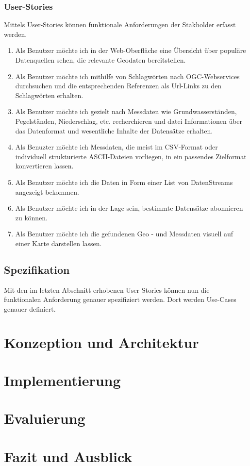 \documentclass[a4paper,12pt]{scrreprt}
\begin{document}
\subsection{User-Stories}
Mittels User-Stories können funktionale Anforderungen der Stakholder erfasst werden.
\begin{enumerate}
\item Als Benutzer möchte ich in der Web-Oberfläche eine Übersicht über populäre Datenquellen sehen, die  relevante Geodaten bereitstellen.
\item Als Benutzer möchte ich mithilfe von Schlagwörten nach OGC-Webservices durchsuchen und die entsprechenden Referenzen als Url-Links zu den Schlagwörten erhalten.
\item Als Benutzer möchte ich gezielt nach Messdaten wie Grundwasserständen, Pegelständen, Niederschlag, etc. recherchieren und datei Informationen über das Datenformat und wesentliche Inhalte der Datensätze erhalten.
\item Als Benuzter möchte ich Messdaten, die meist im CSV-Format oder individuell strukturierte ASCII-Dateien vorliegen, in ein passendes Zielformat konvertieren lassen.
\item Als Benutzer möchte ich die Daten in Form einer List von DatenStreams angezeigt bekommen.
\item Als Benutzer möchte ich in der Lage sein, bestimmte Datensätze abonnieren zu können.
\item Als Benutzer möchte ich die gefundenen Geo - und Messdaten visuell auf einer Karte darstellen lassen.
\end{enumerate}

\section{Spezifikation}
Mit den im letzten Abschnitt erhobenen User-Stories können nun die funktionalen Anforderung genauer spezifiziert werden. Dort werden Use-Cases genauer definiert.

\chapter{Konzeption und Architektur}

\chapter{Implementierung}

\chapter{Evaluierung}

\chapter{Fazit und Ausblick}

\printbibliography
\end{document}
